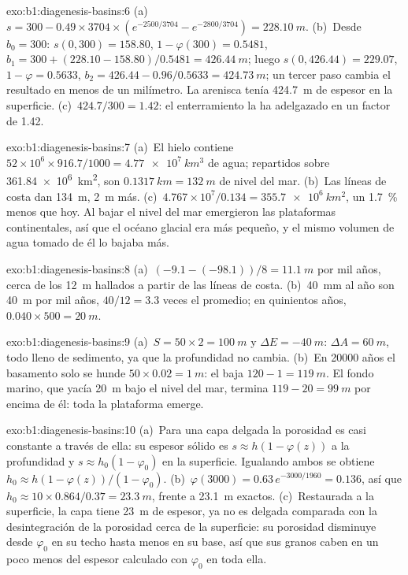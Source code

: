 \begin{solution}{exo:b1:diagenesis-basins:6}
(a)~$s = 300 - 0.49\times3704\times(e^{-2500/3704} - e^{-2800/3704}) =
\qty{228.10}{m}$. (b)~Desde $b_0 = 300$: $s(0, 300) = 158.80$, $1 - \varphi(300) =
0.5481$, $b_1 = 300 + (228.10 - 158.80)/0.5481 = \qty{426.44}{m}$; luego
$s(0, 426.44) = 229.07$, $1 - \varphi = 0.5633$, $b_2 = 426.44 - 0.96/0.5633 =
\qty{424.73}{m}$; un tercer paso cambia el resultado en menos de un milímetro. La
arenisca tenía \qty{424.7}{m} de espesor en la superficie. (c)~$424.7/300 = 1.42$: el enterramiento la ha adelgazado en un factor de \num{1.42}.
\end{solution}

\begin{solution}{exo:b1:diagenesis-basins:7}
(a)~El hielo contiene $52\times10^6\times916.7/1000 = \qty{4.77e7}{km^3}$ de agua; repartidos sobre \qty{361.84e6}{km^2}, son $\qty{0.1317}{km} = \qty{132}{m}$ de nivel del mar. (b)~Las
líneas de costa dan \qty{134}{m}, \qty{2}{m} más. (c)~$4.767\times
10^7/0.134 = \qty{355.7e6}{km^2}$, un \qty{1.7}{\%} menos que hoy. Al bajar el nivel del mar emergieron las plataformas continentales, así que el océano glacial era más pequeño, y el mismo volumen
de agua tomado de él lo bajaba más.
\end{solution}

\begin{solution}{exo:b1:diagenesis-basins:8}
(a)~$(-9.1 - (-98.1))/8 = \qty{11.1}{m}$ por mil años, cerca de los \qty{12}{m} hallados a partir de las líneas de costa. (b)~\qty{40}{mm} al año son \qty{40}{m} por mil años,
$40/12 = 3.3$ veces el promedio; en quinientos años, $0.040\times500 = \qty{20}{m}$.
\end{solution}

\begin{solution}{exo:b1:diagenesis-basins:9}
(a)~$S = 50\times2 = \qty{100}{m}$ y $\Delta E = \qty{-40}{m}$: $\Delta A = \qty{60}{m}$, todo lleno de sedimento, ya que la profundidad no cambia. (b)~En \num{20000} años el basamento solo se
hunde $50\times0.02 = \qty{1}{m}$: el  baja $120 - 1 = \qty{119}{m}$. El fondo marino, que yacía
\qty{20}{m} bajo el nivel del mar, termina $119 - 20 = \qty{99}{m}$ por encima de él: toda la plataforma emerge.
\end{solution}

\begin{solution}{exo:b1:diagenesis-basins:10}
(a)~Para una capa delgada la porosidad es casi constante a través de ella: su espesor sólido es $s \approx h(1 - \varphi(z))$ a la profundidad y $s \approx h_0(1 -
\varphi_0)$ en la superficie. Igualando ambos se obtiene $h_0 \approx h(1 -
\varphi(z))/(1 - \varphi_0)$. (b)~$\varphi(3000) = 0.63\,e^{-3000/1960} =
0.136$, así que $h_0 \approx 10\times0.864/0.37 = \qty{23.3}{m}$, frente a \qty{23.1}{m} exactos. (c)~Restaurada a la superficie, la capa tiene \qty{23}{m} de espesor, ya no
es delgada comparada con la desintegración de la porosidad cerca de la superficie: su porosidad disminuye desde $\varphi_0$ en su techo hasta menos en su base, así que sus granos
caben en un poco menos del espesor calculado con $\varphi_0$ en toda ella.
\end{solution}


